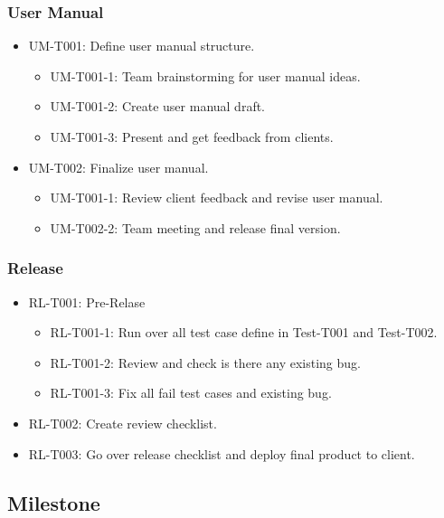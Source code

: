 \documentclass[11pt, a4paper]{article}
\begin{document}
		\subsubsection{User Manual}
		\begin{itemize}
			\item UM-T001: Define user manual structure.
			\begin{itemize}
					\item UM-T001-1: Team brainstorming for user manual ideas.
					\item UM-T001-2: Create user manual draft.
					\item UM-T001-3: Present and get feedback from clients.
			\end{itemize}
			\item UM-T002: Finalize user manual. 
			\begin{itemize}
					\item UM-T001-1: Review client feedback and revise user manual.
					\item UM-T002-2: Team meeting and release final version.
			\end{itemize}
		\end{itemize}
	
		\subsubsection{Release}
		\begin{itemize}
			\item RL-T001: Pre-Relase
			\begin{itemize}
				\item RL-T001-1: Run over all test case define in Test-T001 and Test-T002.
				\item RL-T001-2: Review and check is there any existing bug.
				\item RL-T001-3: Fix all fail test cases and existing bug. 
			\end{itemize}
			\item RL-T002: Create review checklist.
			\item RL-T003: Go over release checklist and deploy final product to client.
		\end{itemize}
		
		
	\subsection{Milestone}
\end{document}
